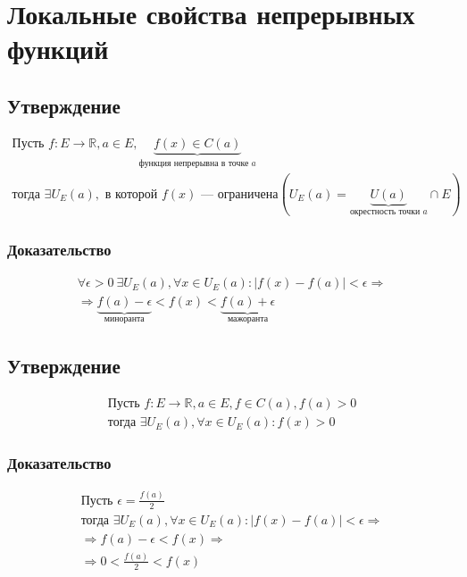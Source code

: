 \documentclass{article}
\begin{document}
\section{Локальные свойства непрерывных функций}

\subsection{Утверждение}
\begin{gather*}
    \text{Пусть } f: E \rightarrow \mathbb{R}, a \in E, \underbrace{f(x) \in C(a)}_{\text{функция непрерывна в точке } a} \\
    \text{тогда } \exists U_E(a), \text{ в которой } f(x) \text{ --- ограничена}
    \left( U_E(a) = \underbrace{U(a)}_{\text{окрестность точки } a} \cap E \right)
\end{gather*}

\subsubsection{Доказательство}
\begin{gather*}
    \forall \epsilon > 0 ~ \exists U_E(a), \forall x \in U_E(a): |f(x) - f(a)| < \epsilon \Rightarrow \\
    \Rightarrow \underbrace{f(a) - \epsilon}_{\text{миноранта}} < f(x) < \underbrace{f(a) + \epsilon}_{\text{мажоранта}}
\end{gather*}


\subsection{Утверждение}
\begin{gather*}
    \text{Пусть } f: E \rightarrow \mathbb{R}, a \in E, f \in C(a), f(a) > 0 \\
    \text{тогда } \exists U_E(a), \forall x \in U_E(a): f(x) > 0
\end{gather*}

\subsubsection{Доказательство}
\begin{gather*}
    \text{Пусть } \epsilon = \frac{f(a)}{2} \\
    \text{тогда } \exists U_E(a), \forall x \in U_E(a): \left| f(x) - f(a) \right| < \epsilon \Rightarrow \\
    \Rightarrow f(a) - \epsilon < f(x) \Rightarrow \\
    \Rightarrow 0 < \frac{f(a)}{2}< f(x)
\end{gather*}
\end{document}
